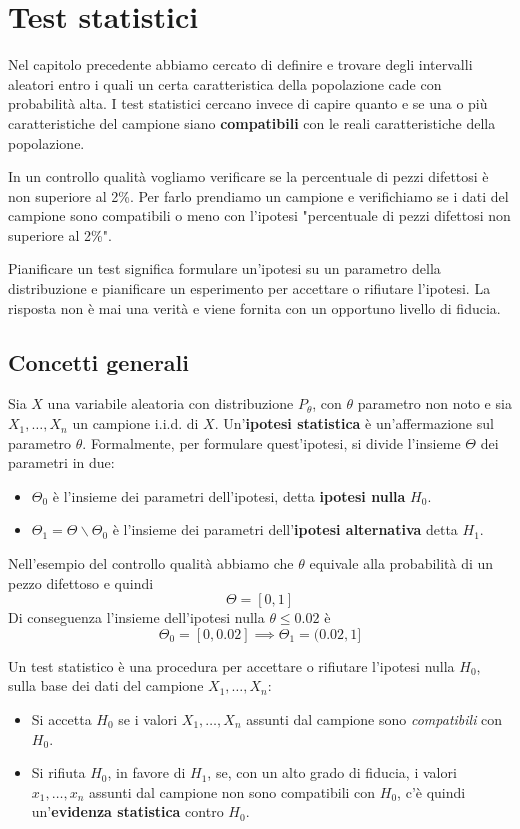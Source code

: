 \chapter{Test statistici}
Nel capitolo precedente abbiamo cercato di definire e trovare degli intervalli aleatori entro i
quali un certa caratteristica della popolazione cade con probabilità alta. I test statistici
cercano invece di capire quanto e se una o più caratteristiche del campione siano
\textbf{compatibili} con le reali caratteristiche della popolazione.

In un controllo qualità vogliamo verificare se la percentuale di pezzi difettosi è non superiore
al 2\%. Per farlo prendiamo un campione e verifichiamo se i dati del campione sono compatibili o
meno con l'ipotesi "percentuale di pezzi difettosi non superiore al 2\%".

Pianificare un test significa formulare un'ipotesi su un parametro della distribuzione e
pianificare un esperimento per accettare o rifiutare l'ipotesi. La risposta non è mai una verità
e viene fornita con un opportuno livello di fiducia.

\section{Concetti generali}
Sia $X$ una variabile aleatoria con distribuzione $P_\theta$, con $\theta$ parametro non noto e
sia $X_1, \dots, X_n$ un campione i.i.d. di $X$. Un'\textbf{ipotesi statistica} è un'affermazione
sul parametro $\theta$. Formalmente, per formulare quest'ipotesi, si divide l'insieme $\Theta$ dei
parametri in due:
\begin{itemize}
	\item $\Theta_0$ è l'insieme dei parametri dell'ipotesi, detta \textbf{ipotesi nulla} $H_0$.
	\item $\Theta_1 = \Theta \backslash \Theta_0$ è l'insieme dei parametri
	      dell'\textbf{ipotesi alternativa} detta $H_1$.
\end{itemize}

\begin{example}
	Nell'esempio del controllo qualità abbiamo che $\theta$ equivale alla probabilità di un pezzo
	difettoso e quindi
	\[ \Theta = [0, 1] \]
	Di conseguenza l'insieme dell'ipotesi nulla $\theta \leq 0.02$ è
	\[ \Theta_0 = [0, 0.02] \implies \Theta_1 = (0.02, 1] \]
\end{example}

Un test statistico è una procedura per accettare o rifiutare l'ipotesi nulla $H_0$, sulla base dei
dati del campione $X_1, \dots, X_n$:
\begin{itemize}
	\item Si accetta $H_0$ se i valori $X_1, \dots, X_n$ assunti dal campione sono
	      \emph{compatibili} con $H_0$.
	\item Si rifiuta $H_0$, in favore di $H_1$, se, con un alto grado di fiducia, i valori
	      $x_1, \dots, x_n$ assunti dal campione non sono compatibili con $H_0$, c'è quindi
	      un'\textbf{evidenza statistica} contro $H_0$.
\end{itemize}

